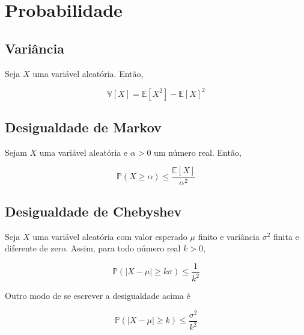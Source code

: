 \chapter{Probabilidade}
\label{ap:probability}

\section{Variância}
\label{ap:variance}

Seja $X$ uma variável aleatória. Então,

\[ \mathbb{V}[X] = \mathbb{E}[X^2] - \mathbb{E}[X]^2\]

\section{Desigualdade de Markov}
\label{ap:markov}

Sejam $X$ uma variável aleatória e $\alpha > 0$ um número real. Então,

\[ \mathbb{P}(X \geq \alpha) \leq \frac{\mathbb{E}[X]}{\alpha^2}\]


\section{Desigualdade de Chebyshev}
\label{ap:chebyshev}

Seja $X$ uma variável aleatória com valor esperado $\mu$ finito e variância $\sigma^2$ finita e diferente de zero. 
Assim, para todo número real $k > 0$, 

\[ \mathbb{P}(| X - \mu| \geq k\sigma) \leq \frac{1}{k^2}\]

Outro modo de se escrever a desigualdade acima é 

\[ \mathbb{P}(| X - \mu| \geq k) \leq \frac{\sigma^2}{k^2} \]